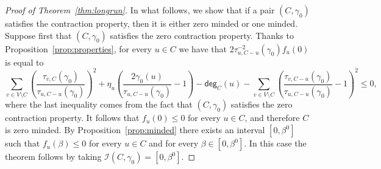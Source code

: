 \documentclass[letterpaper,11pt]{article}
\newcommand{\degsf}{\mathsf{deg}}
\begin{document}
\begin{proof}[Proof of Theorem~\ref{thm:longrun}]
In what follows, we show that if a pair $(C,\gamma_0)$ satisfies the contraction property, then it is either zero minded or one minded. 
Suppose first that $(C,\gamma_0)$ satisfies the zero contraction property. 
Thanks to Proposition~\ref{prop:properties}, for every $u\in C$ we have that $2\tau^{-2}_{u,C-u}(\gamma_0)f_u(0)$ is equal to
\begin{equation*}
\sum_{v\in V\setminus C}\left(\frac{\tau_{v,C}(\gamma_0)}{\tau_{u,C-u}(\gamma_0)}\right)^2+\eta_u\left(\frac{2\gamma_0(u)}{\tau_{u,C-u}(\gamma_0)}-1\right)-\degsf_C(u) - \sum_{v\in V\setminus C}\left(\frac{\tau_{v,C-u}(\gamma_0)}{\tau_{u,C-u}(\gamma_0)}-1\right)^2\le 0,
\end{equation*}
where the last inequality comes from the fact that $(C,\gamma_0)$ satisfies the zero contraction property.
It follows that $f_u(0)\le 0$ for every $u\in C$, and therefore $C$ is zero minded. 
By Proposition~\ref{prop:minded} there exists an interval $[0,\beta^0]$ such that $f_u(\beta)\le 0$ for every $u\in C$ and for every $\beta\in [0,\beta^0]$. 
In this case the theorem follows by taking $\mathcal{I}(C,\gamma_0)=[0,\beta^0]$.
\end{proof}
\end{document}
